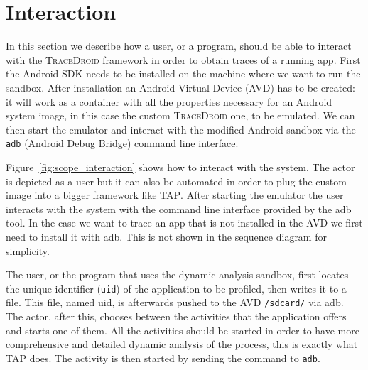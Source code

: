 \section{Interaction}
\label{sec:scope_interaction}

In this section we describe how a user, or a program, should be able
to interact with the \textsc{TraceDroid} framework in order to obtain traces of a
running app. First the Android SDK needs to be installed on the
machine where we want to run the sandbox. After installation an
Android Virtual Device (AVD) has to be created: it will work as a
container with all the properties necessary for an Android system
image, in this case the custom \textsc{TraceDroid} one, to be emulated. We can
then start the emulator and interact with the modified Android sandbox
via the \texttt{adb} (Android Debug Bridge) command line interface.

Figure~\ref{fig:scope_interaction} shows how to interact with the system. The actor is
depicted as a user but it can also be automated in order to plug the
custom image into a bigger framework like \textsc{TAP}. After starting the
emulator the user interacts with the system with the command line
interface provided by the adb tool. In the case we want to trace an
app that is not installed in the AVD we first need to install it with
adb. This is not shown in the sequence diagram for simplicity.

The user, or the program that uses the dynamic analysis sandbox,
first locates the unique identifier (\texttt{uid}) of the application to
be profiled, then writes it to a file. This file, named uid, is afterwards pushed to the
AVD \texttt{/sdcard/} via adb. The actor, after this, chooses between the
activities that the application offers and starts one of them. All the
activities should be started in order to have more comprehensive and
detailed dynamic analysis of the process, this is exactly what \textsc{TAP}
does. The activity is then started by sending the command to \texttt{adb}.

